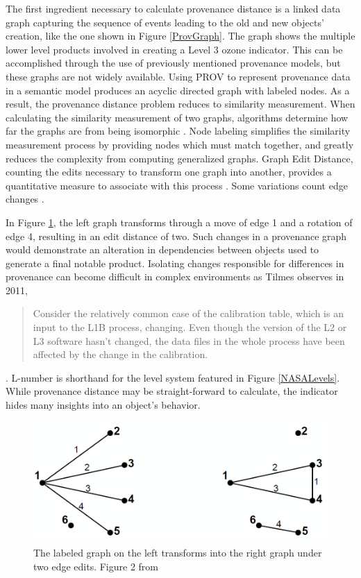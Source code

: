 The first ingredient necessary to calculate provenance distance is a linked data graph capturing the sequence of events leading to the old and new objects' creation, like the one shown in Figure \ref{ProvGraph}.
The graph shows the multiple lower level products involved in creating a Level 3 ozone indicator.
This can be accomplished through the use of previously mentioned provenance models, but these graphs are not widely available.
Using PROV to represent provenance data in a semantic model produces an acyclic directed graph with labeled nodes.
As a result, the provenance distance problem reduces to similarity measurement.
When calculating the similarity measurement of two graphs, algorithms determine how far the graphs are from being isomorphic \cite{Cao2013}.
Node labeling simplifies the similarity measurement process by providing nodes which must match together, and greatly reduces the complexity from computing generalized graphs.
Graph Edit Distance, counting the edits necessary to transform one graph into another, provides a quantitative measure to associate with this process  \cite{Gao2010}.
Some variations count edge changes \cite{Goddard:1996:DGU:246962.246972}.

In Figure \ref{GraphEdit}, the left graph transforms through a move of edge 1 and a rotation of edge 4, resulting in an edit distance of two.
Such changes in a provenance graph would demonstrate an alteration in dependencies between objects used to generate a final notable product.
Isolating changes responsible for differences in provenance can become difficult in complex environments as Tilmes observes in 2011, 
\begin{quotation}
	Consider the relatively common case of the calibration table, which is an input to the L1B process, changing. Even though the version of the L2 or L3 software hasn't changed, the data files in the whole process have been affected by the change in the calibration.
\end{quotation} \cite{TILMES2011548}.
L-number is shorthand for the level system featured in Figure \ref{NASALevels}.
While provenance distance may be straight-forward to calculate, the indicator hides many insights into an object's behavior.

\begin{figure}
	\centering
	\includegraphics[scale=0.40]{figures/GraphEdit.png}
	\caption[The labeled graph on the left transforms into the right graph under two edge edits.]{The labeled graph on the left transforms into the right graph under two edge edits. Figure 2 from \cite{Goddard:1996:DGU:246962.246972}}
	\label{GraphEdit}
\end{figure}

